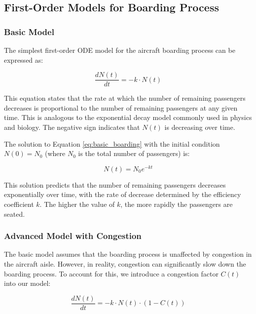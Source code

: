 \documentclass[12pt,a4paper]{article}
\begin{document}
\subsection{First-Order Models for Boarding Process}

\subsubsection{Basic Model}

The simplest first-order ODE model for the aircraft boarding process can be expressed as:

\begin{equation}
\frac{dN(t)}{dt} = -k \cdot N(t)
\label{eq:basic_boarding}
\end{equation}

This equation states that the rate at which the number of remaining passengers decreases is proportional to the number of remaining passengers at any given time. This is analogous to the exponential decay model commonly used in physics and biology. The negative sign indicates that $N(t)$ is decreasing over time.

The solution to Equation \ref{eq:basic_boarding} with the initial condition $N(0) = N_0$ (where $N_0$ is the total number of passengers) is:

\begin{equation}
N(t) = N_0 e^{-kt}
\label{eq:basic_solution}
\end{equation}

This solution predicts that the number of remaining passengers decreases exponentially over time, with the rate of decrease determined by the efficiency coefficient $k$. The higher the value of $k$, the more rapidly the passengers are seated.

\subsubsection{Advanced Model with Congestion}

The basic model assumes that the boarding process is unaffected by congestion in the aircraft aisle. However, in reality, congestion can significantly slow down the boarding process. To account for this, we introduce a congestion factor $C(t)$ into our model:

\begin{equation}
\frac{dN(t)}{dt} = -k \cdot N(t) \cdot (1 - C(t))
\label{eq:advanced_boarding}
\end{equation}
\end{document}
